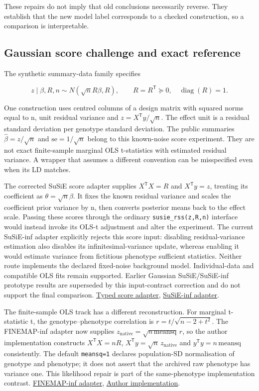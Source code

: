 \documentclass[
  british,
  10pt,
]{article}
\begin{document}
These repairs do not imply that old conclusions necessarily reverse.
They establish that the new model label corresponds to a checked
construction, so a comparison is interpretable.

\subsection{Gaussian score challenge and exact
reference}\label{gaussian-score-challenge-and-exact-reference}

The synthetic summary-data family specifies

\[z\mid\beta,R,n\sim N(\sqrt{n}R\beta,R),\qquad
R=R^\mathsf{T}\succeq0,\quad\operatorname{diag}(R)=1.\]

One construction uses centred columns of a design matrix with squared
norms equal to n, unit residual variance and
\(z=X^\mathsf{T}y/\sqrt n\). The effect unit is a residual standard
deviation per genotype standard deviation. The public summaries
\(\hat\beta=z/\sqrt n\) and \(\mathrm{se}=1/\sqrt n\) belong to this
known-noise score experiment. They are not exact finite-sample marginal
OLS t-statistics with estimated residual variance. A wrapper that
assumes a different convention can be misspecified even when its LD
matches.

The corrected SuSiE score adapter supplies \(X^\mathsf{T}X=R\) and
\(X^\mathsf{T}y=z\), treating its coefficient as
\(\theta=\sqrt n\beta\). It fixes the known residual variance and scales
the coefficient prior variance by n, then converts posterior means back
to the effect scale. Passing these scores through the ordinary
\texttt{susie\_rss(z,R,n)} interface would instead invoke its OLS-t
adjustment and alter the experiment. The current SuSiE-inf adapter
explicitly rejects this score input: disabling residual-variance
estimation also disables its infinitesimal-variance update, whereas
enabling it would estimate variance from fictitious phenotype sufficient
statistics. Neither route implements the declared fixed-noise background
model. Individual-data and compatible OLS fits remain supported. Earlier
Gaussian SuSiE/SuSiE-inf prototype results are superseded by this
input-contract correction and do not support the final comparison.
\href{../R/gaussian_score_adapter.R}{Typed score adapter},
\href{../R/wrapper_susie_inf.R}{SuSiE-inf adapter}.

The finite-sample OLS track has a different reconstruction. For marginal
t-statistic t, the genotype--phenotype correlation is
\(r=t/\sqrt{n-2+t^2}\). The FINEMAP-inf adapter now supplies
\(z_{\mathrm{native}}=\sqrt{n\,\mathrm{meansq}}\,r\), so the author
implementation constructs \(X^\mathsf{T}X=nR\),
\(X^\mathsf{T}y=\sqrt n\,z_{\mathrm{native}}\) and
\(y^\mathsf{T}y=n\,\mathrm{meansq}\) consistently. The default
\texttt{meansq=1} declares population-SD normalisation of genotype and
phenotype; it does not assert that the archived raw phenotype has
variance one. This likelihood repair is part of the same-phenotype
implementation contrast. \href{../R/wrapper_finemap_inf.R}{FINEMAP-inf
adapter}, \href{https://github.com/FinucaneLab/fine-mapping-inf}{Author
implementation}.
\end{document}
